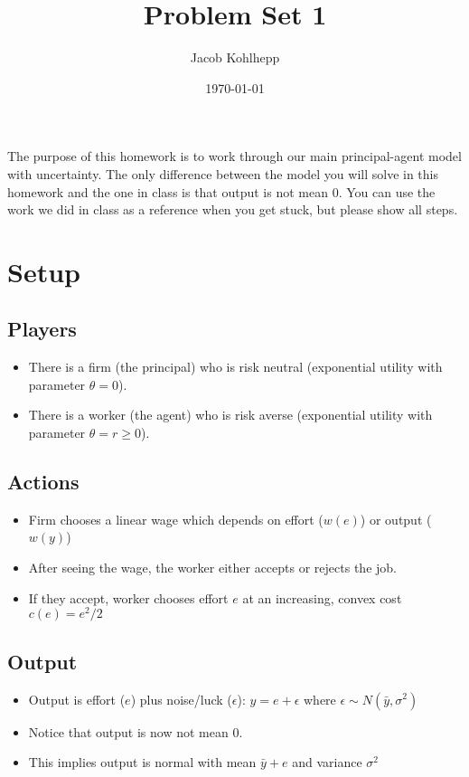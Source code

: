 \documentclass{article}
\title{Problem Set 1}
\author{Jacob Kohlhepp}
\date{\today}
\begin{document}
\maketitle


The purpose of this homework is to work through our main principal-agent model with uncertainty. The only difference between the model you will solve in this homework and the one in class is that output is not mean 0. You can use the work we did in class as a reference when you get stuck, but please show all steps.

\section*{Setup}
\subsection{Players}
\begin{itemize}
    \item There is a firm (the principal) who is risk neutral (exponential utility with parameter $\theta=0$).
    \item There is a worker (the agent) who is risk averse (exponential utility with parameter $\theta=r\geq 0$).
\end{itemize}
\subsection{Actions}
    \begin{itemize}
    \item Firm chooses a linear wage which depends on effort ($w(e)$) or output ($w(y)$)
    \item After seeing the wage, the worker either accepts or rejects the job.
    \item If they accept, worker chooses effort $e$ at an increasing, convex cost $c(e)=e^2/2$
\end{itemize}
\subsection{Output}
    \begin{itemize}
    \item Output is effort ($e$) plus noise/luck ($\epsilon$): $y=e+\epsilon$ where $\epsilon\sim N(\bar y,\sigma^2)$
    \item Notice that output is now not mean 0.
    \item This implies output is normal with mean $\bar y+e$ and variance $\sigma^2$
\end{itemize}
\end{document}
